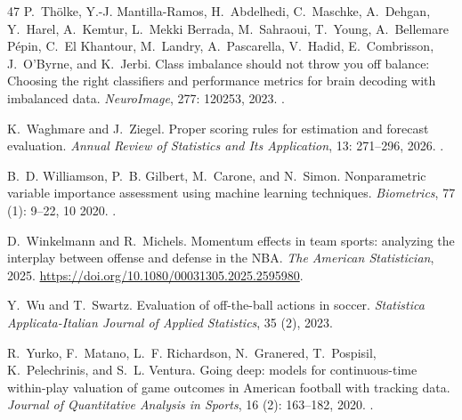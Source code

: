 \documentclass[namedate,webpdf,modern,medium]{oup-authoring-template}
\begin{document}
\begin{thebibliography}{47}
P.~Thölke, Y.-J. Mantilla-Ramos, H.~Abdelhedi, C.~Maschke, A.~Dehgan,
  Y.~Harel, A.~Kemtur, L.~{Mekki Berrada}, M.~Sahraoui, T.~Young, A.~{Bellemare
  Pépin}, C.~{El Khantour}, M.~Landry, A.~Pascarella, V.~Hadid, E.~Combrisson,
  J.~O’Byrne, and K.~Jerbi.
\newblock Class imbalance should not throw you off balance: Choosing the right
  classifiers and performance metrics for brain decoding with imbalanced data.
\newblock \emph{NeuroImage}, 277: 120253, 2023.
\newblock {}.

K.~Waghmare and J.~Ziegel.
\newblock Proper scoring rules for estimation and forecast evaluation.
\newblock \emph{Annual Review of Statistics and Its Application}, 13:
  271--296, 2026.
\newblock {}.

B.~D. Williamson, P.~B. Gilbert, M.~Carone, and N.~Simon.
\newblock Nonparametric variable importance assessment using machine learning
  techniques.
\newblock \emph{Biometrics}, 77 (1): 9--22, 10 2020.
\newblock {}.

D.~Winkelmann and R.~Michels.
\newblock Momentum effects in team sports: analyzing the interplay between
  offense and defense in the {NBA}.
\newblock \emph{The American Statistician}, 2025.
\newblock \url{https://doi.org/10.1080/00031305.2025.2595980}.

Y.~Wu and T.~Swartz.
\newblock Evaluation of off-the-ball actions in soccer.
\newblock \emph{Statistica Applicata-Italian Journal of Applied Statistics},
  35 (2), 2023.

R.~Yurko, F.~Matano, L.~F. Richardson, N.~Granered, T.~Pospisil,
  K.~Pelechrinis, and S.~L. Ventura.
\newblock Going deep: models for continuous-time within-play valuation of game
  outcomes in {A}merican football with tracking data.
\newblock \emph{Journal of Quantitative Analysis in Sports}, 16
  (2): 163--182, 2020.
\newblock {}.


\end{thebibliography}
\end{document}
